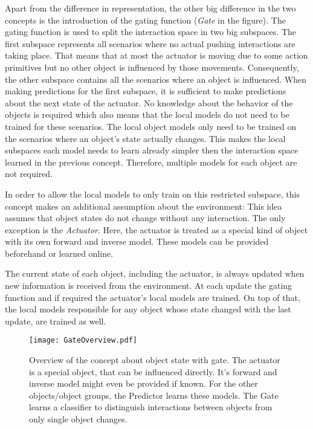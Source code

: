 Apart from the difference in representation, the other big difference in the two concepts is the introduction of the gating function (\textit{Gate} in the figure). The gating function is used to split the interaction space in two big subspaces. The first subspace represents all scenarios where no actual pushing interactions are taking place. That means that at most the actuator is moving due to some action primitives but no other object is influenced by those movements. Consequently, the other subspace contains all the scenarios where an object is influenced. When making predictions for the first subspace, it is sufficient to make predictions about the next state of the actuator. No knowledge about the behavior of the objects is required which also means that the local models do not need to be trained for these scenarios. The local object models only need to be trained on the scenarios where an object's state actually changes. 
This makes the local subspaces each model needs to learn already simpler then the interaction space learned in the previous concept. Therefore, multiple models for each object are not required.

In order to allow the local models to only train on this restricted subspace, this concept makes an additional assumption about the environment: 
This idea assumes that object states do not change without any interaction. The only exception is the \textit{Actuator}. Here, the actuator is treated as a special kind of object with its own forward and inverse model. These models can be provided beforehand or learned online.  

The current state of each object, including the actuator, is always updated when new information is received from the environment. At each update the gating function and if required the actuator's local models are trained. On top of that, the local models responsible for any object whose state changed with the last update, are trained as well.


\begin{figure}
	\centering
	\texttt{[image: GateOverview.pdf]}
	\caption{Overview of the concept about object state with gate. The actuator is a special object, that can be influenced directly. It's forward and inverse model might even be provided if known. For the other objects/object groups, the Predictor learns these models. The Gate learns a classifier to distinguish interactions between objects from only single object changes.} 
	\label{fig:GateOverview}
\end{figure}

